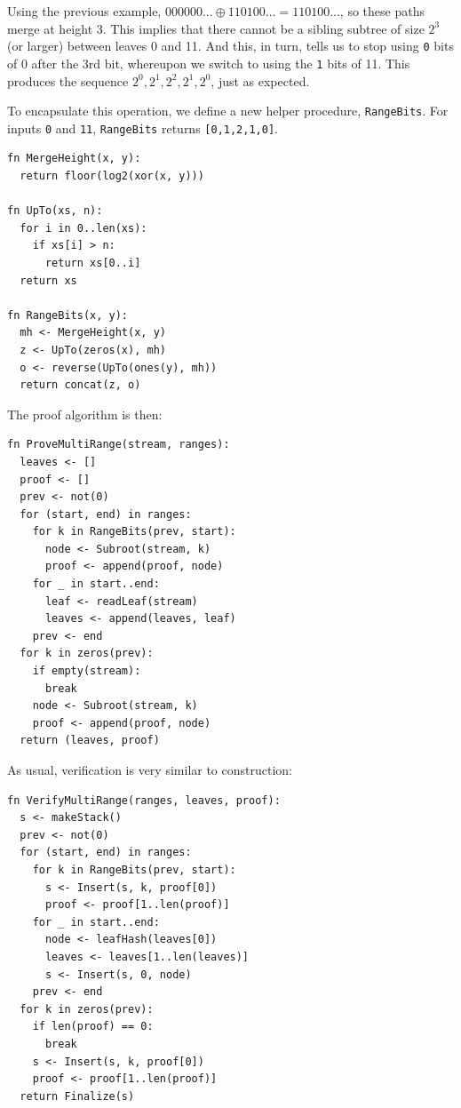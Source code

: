 \documentclass[twocolumn]{article}
\begin{document}
Using the previous example, $000000...\oplus110100... = 110100...$, so these paths merge at height 3. This implies that there cannot be a sibling subtree of size $2^3$ (or larger) between leaves 0 and 11. And this, in turn, tells us to stop using \verb`0` bits of 0 after the 3rd bit, whereupon we switch to using the \verb`1` bits of 11. This produces the sequence $2^0, 2^1, 2^2, 2^1, 2^0$, just as expected.

To encapsulate this operation, we define a new helper procedure, \verb`RangeBits`. For inputs \verb`0` and \verb`11`, \verb`RangeBits` returns \verb`[0,1,2,1,0]`.

\begin{minipage}[c]{0.95\textwidth}
\begin{lstlisting}
fn MergeHeight(x, y):
  return floor(log2(xor(x, y)))
  
fn UpTo(xs, n):
  for i in 0..len(xs):
    if xs[i] > n:
      return xs[0..i]
  return xs
  
fn RangeBits(x, y):
  mh <- MergeHeight(x, y)
  z <- UpTo(zeros(x), mh)
  o <- reverse(UpTo(ones(y), mh))
  return concat(z, o)
\end{lstlisting}
\end{minipage}

\noindent The proof algorithm is then:

\begin{minipage}[c]{0.95\textwidth}
\begin{lstlisting}
fn ProveMultiRange(stream, ranges):
  leaves <- []
  proof <- []
  prev <- not(0)
  for (start, end) in ranges:
    for k in RangeBits(prev, start):
      node <- Subroot(stream, k)
      proof <- append(proof, node)
    for _ in start..end:
      leaf <- readLeaf(stream)
      leaves <- append(leaves, leaf)
    prev <- end
  for k in zeros(prev):
    if empty(stream):
      break
    node <- Subroot(stream, k)
    proof <- append(proof, node)
  return (leaves, proof)
\end{lstlisting}
\end{minipage}

\pagebreak

\noindent As usual, verification is very similar to construction:

\begin{minipage}[c]{0.90\textwidth}
\begin{lstlisting}
fn VerifyMultiRange(ranges, leaves, proof):
  s <- makeStack()
  prev <- not(0)
  for (start, end) in ranges:
    for k in RangeBits(prev, start):
      s <- Insert(s, k, proof[0])
      proof <- proof[1..len(proof)]
    for _ in start..end:
      node <- leafHash(leaves[0])
      leaves <- leaves[1..len(leaves)]
      s <- Insert(s, 0, node)
    prev <- end
  for k in zeros(prev):
    if len(proof) == 0:
      break
    s <- Insert(s, k, proof[0])
    proof <- proof[1..len(proof)]
  return Finalize(s)

\end{lstlisting}
\end{minipage}
\end{document}
